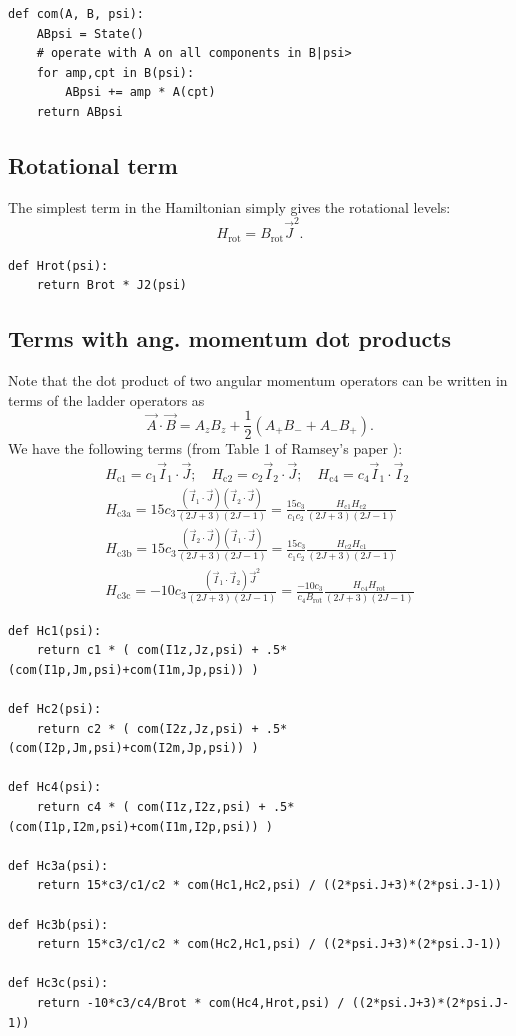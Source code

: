 \begin{lstlisting}
def com(A, B, psi):
    ABpsi = State()
    # operate with A on all components in B|psi>
    for amp,cpt in B(psi):
        ABpsi += amp * A(cpt)
    return ABpsi
\end{lstlisting}

\subsection{Rotational term}

The simplest term in the Hamiltonian simply gives the rotational levels:
%
$$H_\text{rot}=B_\text{rot}\vec J^2.$$

\begin{lstlisting}
def Hrot(psi):
    return Brot * J2(psi)
\end{lstlisting}

\subsection{Terms with ang. momentum dot products}

Note that the dot product of two angular momentum operators can be written in terms of the ladder operators as
%
$$\vec A\cdot\vec B=A_zB_z+\frac{1}{2}(A_+B_-+A_-B_+).$$
%
We have the following terms (from Table 1 of Ramsey's paper
\cite{wilkening1984search}):
%
\begin{align*}
H_\text{c1}=c_1\vec I_1\cdot\vec J;\quad
H_\text{c2}=c_2\vec I_2\cdot\vec J;\quad
H_\text{c4}=c_4\vec I_1\cdot\vec I_2\\
H_\text{c3a}=15c_3\frac{(\vec I_1\cdot\vec J)(\vec I_2\cdot\vec J)}{(2J+3)(2J-1)}
=\frac{15c_3}{c_1c_2}\frac{H_\text{c1}H_\text{c2}}{(2J+3)(2J-1)}\\
H_\text{c3b}=15c_3\frac{(\vec I_2\cdot\vec J)(\vec I_1\cdot\vec J)}{(2J+3)(2J-1)}
=\frac{15c_3}{c_1c_2}\frac{H_\text{c2}H_\text{c1}}{(2J+3)(2J-1)}\\
H_\text{c3c}=-10c_3\frac{(\vec I_1\cdot\vec I_2)\vec J^2}{(2J+3)(2J-1)}
=\frac{-10c_3}{c_4 B_\text{rot}}\frac{H_\text{c4}H_\text{rot}}{(2J+3)(2J-1)}
\end{align*}

\begin{lstlisting}
def Hc1(psi):
    return c1 * ( com(I1z,Jz,psi) + .5*(com(I1p,Jm,psi)+com(I1m,Jp,psi)) )

def Hc2(psi):
    return c2 * ( com(I2z,Jz,psi) + .5*(com(I2p,Jm,psi)+com(I2m,Jp,psi)) )

def Hc4(psi):
    return c4 * ( com(I1z,I2z,psi) + .5*(com(I1p,I2m,psi)+com(I1m,I2p,psi)) )

def Hc3a(psi):
    return 15*c3/c1/c2 * com(Hc1,Hc2,psi) / ((2*psi.J+3)*(2*psi.J-1))

def Hc3b(psi):
    return 15*c3/c1/c2 * com(Hc2,Hc1,psi) / ((2*psi.J+3)*(2*psi.J-1))

def Hc3c(psi):
    return -10*c3/c4/Brot * com(Hc4,Hrot,psi) / ((2*psi.J+3)*(2*psi.J-1))
\end{lstlisting}


